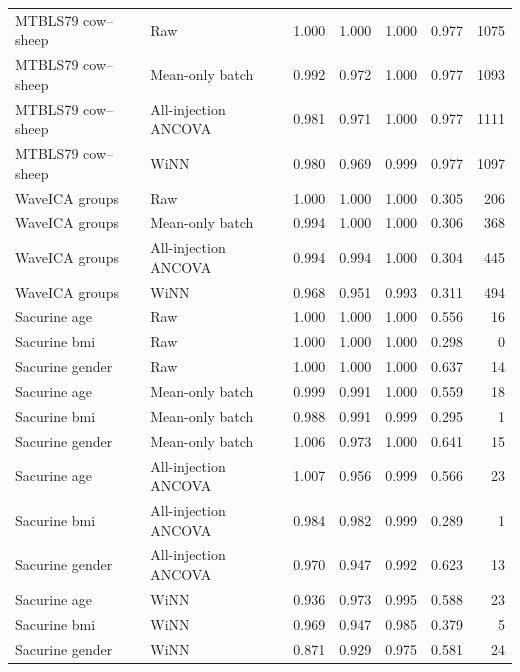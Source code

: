 \begin{landscape}
\begin{longtable}{p{3.0cm}p{3.6cm}rrrrr}
\midrule
MTBLS79 cow--sheep & Raw & 1.000 & 1.000 & 1.000 & 0.977 & 1075 \\
MTBLS79 cow--sheep & Mean-only batch & 0.992 & 0.972 & 1.000 & 0.977 & 1093 \\
MTBLS79 cow--sheep & All-injection ANCOVA & 0.981 & 0.971 & 1.000 & 0.977 & 1111 \\
MTBLS79 cow--sheep & WiNN & 0.980 & 0.969 & 0.999 & 0.977 & 1097 \\
WaveICA groups & Raw & 1.000 & 1.000 & 1.000 & 0.305 & 206 \\
WaveICA groups & Mean-only batch & 0.994 & 1.000 & 1.000 & 0.306 & 368 \\
WaveICA groups & All-injection ANCOVA & 0.994 & 0.994 & 1.000 & 0.304 & 445 \\
WaveICA groups & WiNN & 0.968 & 0.951 & 0.993 & 0.311 & 494 \\
Sacurine age & Raw & 1.000 & 1.000 & 1.000 & 0.556 & 16 \\
Sacurine bmi & Raw & 1.000 & 1.000 & 1.000 & 0.298 & 0 \\
Sacurine gender & Raw & 1.000 & 1.000 & 1.000 & 0.637 & 14 \\
Sacurine age & Mean-only batch & 0.999 & 0.991 & 1.000 & 0.559 & 18 \\
Sacurine bmi & Mean-only batch & 0.988 & 0.991 & 0.999 & 0.295 & 1 \\
Sacurine gender & Mean-only batch & 1.006 & 0.973 & 1.000 & 0.641 & 15 \\
Sacurine age & All-injection ANCOVA & 1.007 & 0.956 & 0.999 & 0.566 & 23 \\
Sacurine bmi & All-injection ANCOVA & 0.984 & 0.982 & 0.999 & 0.289 & 1 \\
Sacurine gender & All-injection ANCOVA & 0.970 & 0.947 & 0.992 & 0.623 & 13 \\
Sacurine age & WiNN & 0.936 & 0.973 & 0.995 & 0.588 & 23 \\
Sacurine bmi & WiNN & 0.969 & 0.947 & 0.985 & 0.379 & 5 \\
Sacurine gender & WiNN & 0.871 & 0.929 & 0.975 & 0.581 & 24 \\
\end{longtable}
\end{landscape}
